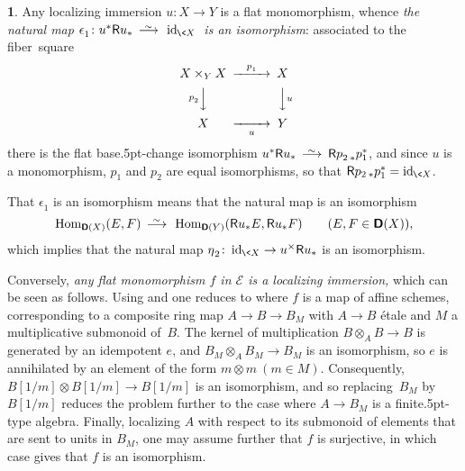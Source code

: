 \documentclass{compositio}
\theoremstyle{plain}
\theoremstyle{definition}
\newtheorem{cosa}[thm]{}
\theoremstyle{remark}
\numberwithin{equation}{thm}
\begin{document}
\begin{cosa}
\label{cosa:localizing-immersion}
Any localizing immersion $u\colon X\to Y$ is a flat monomorphism, whence 
\emph{the natural map\/ 
$\epsilon^{}_1\colon u^*{\mathsf R} u_*{{\mkern8mu\longrightarrow \mkern-25.5mu{}^\sim\mkern17mu}}\operatorname{id}_{{{\mkern-1mu}\<X}}{\mkern1mu}$ is an isomorphism}: associated to the fiber~square
\[
\CD
X\times_Y X @>p^{}_1>> X\\
@Vp^{}_2VV @VVuV\\
X @>>u > Y
\endCD
\]
there is the flat base{\kern.5pt}-change isomorphism $u^*{\mathsf R} u_*{{\mkern8mu\longrightarrow \mkern-25.5mu{}^\sim\mkern17mu}} {\mathsf R} p^{}_{2\>*}p_1^*$, 
and since $u$ is a monomorphism, $p^{}_1$ and $p^{}_2$ are equal isomorphisms, so that 
${\mathsf R} p_{2\>*}p_1^*=\operatorname{id}_{{{\mkern-1mu}\<X}}$.

That $\epsilon^{}_1$ is an isomorphism means that the natural map is an isomorphism
\[
\operatorname{Hom}_{{\boldsymbol{\mathsf{D}}}(X)}(E,F){{\mkern8mu\longrightarrow \mkern-25.5mu{}^\sim\mkern17mu}}\operatorname{Hom}_{{\boldsymbol{\mathsf{D}}}(Y)}({\mathsf R} u_*E, {\mathsf R} u_*F)\qquad(E,F\in{\boldsymbol{\mathsf{D}}}(X)),
\]
which implies  that the natural map $\eta^{}_{{\mkern1mu}2}\colon\operatorname{id}_{{{\mkern-1mu}\<X}}\to u^\times {\mathsf R} u_*$ is  an isomorphism. 

\smallskip
\begin{small} Conversely,  \emph{any flat monomorphism\/ $f$ in\/ ${\mathscr{E}}$ is a localizing immersion,} 
which can be  seen as follows. Using \cite[2.7{\kern.5pt}]{Nk} and \cite[8.11.5.1 and 17.6.1]{EGA4} one reduces to where $f$ is a  map of affine schemes, corresponding to a composite ring map $A\to B\to B_M$ with $A\to B$ \'etale and $M$ a multiplicative submonoid of~$B$. The kernel of multiplication 
 $B\otimes_A B\to B$ is generated by an idempotent $e$,  and 
 $B_M\otimes_A B_M\to B_M$ is an isomorphism, so $e$ is annihilated by an element of the form $m\otimes m\ (m\in M)$. Consequently, $B[1/m]\otimes B[1/m]\to B[1/m]$ is an isomorphism, and so replacing~$B_M$ by $B[1/m]$ reduces the problem further to the case where 
$A\to B_M$ is a finite{\kern.5pt}-type algebra. Finally, localizing $A$ with respect to its  submonoid of elements that are sent to units in $B_M$, one may assume further that $f$ is surjective, in which 
case \cite[17.9.1]{EGA4} gives that $f$ is an isomorphism.
\end{small}
\end{cosa}
\end{document}
